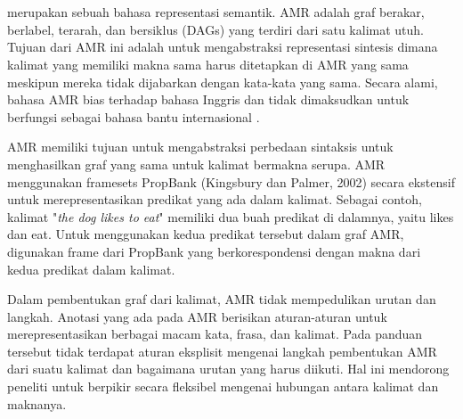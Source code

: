\section{}

 merupakan sebuah bahasa representasi semantik.
\gls{AMR} adalah graf berakar, berlabel, terarah, dan bersiklus (DAGs) yang terdiri dari satu kalimat utuh.
Tujuan dari \gls{AMR} ini adalah untuk mengabstraksi representasi sintesis dimana kalimat yang memiliki makna sama harus ditetapkan di \gls{AMR} yang sama meskipun mereka tidak dijabarkan dengan kata-kata yang sama.
Secara alami, bahasa \gls{AMR} bias terhadap bahasa Inggris dan tidak dimaksudkan untuk berfungsi sebagai bahasa bantu internasional \textcite{banarescu2013}.

\gls{AMR} memiliki tujuan untuk mengabstraksi perbedaan sintaksis untuk menghasilkan graf yang sama untuk kalimat bermakna serupa.
\gls{AMR} menggunakan framesets PropBank (Kingsbury dan Palmer, 2002) secara ekstensif untuk merepresentasikan predikat yang ada dalam kalimat.
Sebagai contoh, kalimat "\textit{the dog likes to eat}" memiliki dua buah predikat di dalamnya, yaitu likes dan eat.
Untuk menggunakan kedua predikat tersebut dalam graf \gls{AMR}, digunakan frame dari PropBank yang berkorespondensi dengan makna dari kedua predikat dalam kalimat.

Dalam pembentukan graf dari kalimat, \gls{AMR} tidak mempedulikan urutan dan langkah.
Anotasi yang ada pada \gls{AMR} berisikan aturan-aturan untuk merepresentasikan berbagai macam kata, frasa, dan kalimat.
Pada panduan tersebut tidak terdapat aturan eksplisit mengenai langkah pembentukan \gls{AMR} dari suatu kalimat dan bagaimana urutan yang harus diikuti.
Hal ini mendorong peneliti untuk berpikir secara fleksibel mengenai hubungan antara kalimat dan maknanya.

